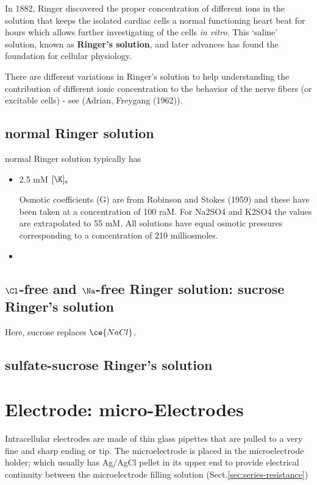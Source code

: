 In 1882, Ringer discovered the proper concentration of different ions in the
solution that keeps the isolated cardiac cells a normal functioning heart beat
for hours which allows further investigating of the cells {\it in vitro}. This
`saline' solution, known as {\bf Ringer's solution}, and later advances has
found the foundation for cellular physiology.

There are different variations in Ringer's solution to help understanding the
contribution of different ionic concentration to the behavior of the nerve
fibers (or excitable cells) - see (Adrian, Freygang (1962)).

\subsection{normal Ringer solution}

normal Ringer solution typically has
\begin{itemize}
  \item 2.5 mM $[\K]_e$

Osmotic coefficients (G) are from Robinson and Stokes (1959) and these have
been taken at a concentration of 100 raM. For Na2SO4 and K2SO4 the values are
extrapolated to 55 mM.
All solutions have equal osmotic pressures corresponding to a
concentration of 210 milliosmoles.

  \item
\end{itemize}

\subsection{$\Cl$-free and $\Na$-free Ringer solution: sucrose Ringer's
solution}
\label{sec:Ringer-solution-Cl-free-Na-free}

Here, sucrose replaces $\ce{NaCl}$.

\subsection{sulfate-sucrose Ringer's solution}
\label{sec:Ringer-solution-sulfate-sucrose}




\section{Electrode: micro-Electrodes}
\label{sec:electrode}
\label{sec:micro-electrodes}

Intracellular electrodes are made of thin glass pipettes that are pulled to a
very fine and sharp ending or tip.
The microelectrode is placed in the microelectrode holder; which usually has
Ag/AgCl pellet in its upper end to provide electrical continuity between the
microelectrode filling solution (Sect.\ref{sec:series-resistance})


